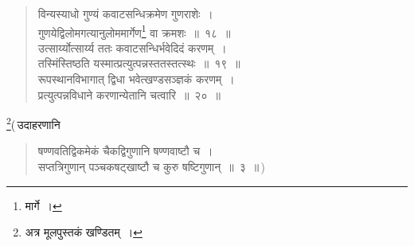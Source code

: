 \documentclass[10pt, openany]{book}
\begin{document}
{

\newpage


 \label{18}
\begin{quote}{\bs विन्यस्याधो गुण्यं कवाटसन्धिक्रमेण गुणराशेः~। \\
 गुणयेद्विलोमगत्यानुलोममार्गेण\renewcommand{\thefootnote}{\s २}\footnote{\s *मार्गे~।} वा क्रमशः~॥~१८~॥ \\
 उत्सार्य्योत्सार्य्य ततः कवाटसन्धिर्भवेदिदं करणम्~। \\
 तस्मिंस्तिष्ठति यस्मात्प्रत्युत्पन्नस्ततस्तत्स्थः~॥~१९~॥ \\
 रूपस्थानविभागात् द्विधा भवेत्खण्डसञ्ज्ञकं करणम्~। \\
 प्रत्युत्पन्नविधाने करणान्येतानि चत्वारि~॥~२०~॥}\end{quote}

 \noindent\renewcommand{\thefootnote}{\s ३}\footnote{\s अत्र मूलपुस्तकं खण्डितम्~।}(\,उदाहरणानि\textemdash

\begin{quote}
{\eg षण्णवतिद्विकमेकं चैकद्विगुणानि षण्णवाष्टौ च~। \\
 सप्तत्रिगुणान् पञ्चकषट्खाष्टौ च कुरु षष्टिगुणान्~॥~३~॥}\,)
 \end{quote}

}
\end{document}
